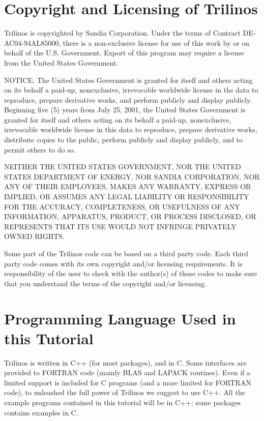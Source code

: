 
\section{Copyright and Licensing of Trilinos}
\label{sec:copyright}

Trilinos is copyrighted by Sandia Corporation. Under the terms of
Contract DE-AC04-94AL85000, there is a non-exclusive license for use of
this work by or on behalf of the U.S. Government.  Export of this
program may require a license from the United States Government.

NOTICE: The United States Government is granted for itself and others
acting on its behalf a paid-up, nonexclusive, irrevocable worldwide
license in ths data to reproduce, prepare derivative works, and perform
publicly and display publicly.  Beginning five (5) years from July 25,
2001, the United States Government is granted for itself and others
acting on its behalf a paid-up, nonexclusive, irrevocable worldwide
license in this data to reproduce, prepare derivative works, distribute
copies to the public, perform publicly and display publicly, and to
permit others to do so.

NEITHER THE UNITED STATES GOVERNMENT, NOR THE UNITED STATES DEPARTMENT
OF ENERGY, NOR SANDIA CORPORATION, NOR ANY OF THEIR EMPLOYEES, MAKES ANY
WARRANTY, EXPRESS OR IMPLIED, OR ASSUMES ANY LEGAL LIABILITY OR
RESPONSIBILITY FOR THE ACCURACY, COMPLETENESS, OR USEFULNESS OF ANY
INFORMATION, APPARATUS, PRODUCT, OR PROCESS DISCLOSED, OR REPRESENTS
THAT ITS USE WOULD NOT INFRINGE PRIVATELY OWNED RIGHTS.

\medskip

Some part of the Trilinos code can be based on a third party code. Each
third party code comes with its own copyright and/or licensing
requirements. It is responsibility of the user to check with the
author(s) of those codes to make sure that you understand the terms of
the copyright and/or licensing.


\section{Programming Language Used in this Tutorial}
\label{sec:language}

Trilinos is written in C++ (for most packages), and in C. Some
interfaces are provided to FORTRAN code (mainly BLAS and LAPACK
routines). Even if a limited support is included for C programs (and a
more limited for FORTRAN code), to unleashed the full power of Trilinos
we suggest to use C++. All the example programs contained in this
tutorial will be in C++; some packages contains examples in C.

